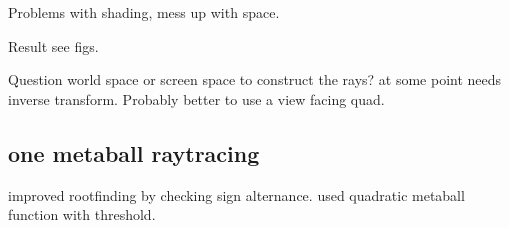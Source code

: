 \documentclass[11pt]{article}
\numberwithin{figure}{section}
\begin{document}
Problems with shading, mess up with space.

Result see figs.

Question world space or screen space to construct the rays? at some point needs inverse transform.
Probably better to use a view facing quad.

\subsection{one metaball raytracing}

improved rootfinding by checking sign alternance.
used quadratic metaball function with threshold.


%

%
\end{document}

